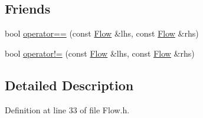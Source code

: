 \subsection*{Friends}
\begin{DoxyCompactItemize}
\item 
bool \hyperlink{class_vsid_common_1_1_flow_adf202422cece5e6dc6ad096f58c35b7c}{operator==} (const \hyperlink{class_vsid_common_1_1_flow}{Flow} \&lhs, const \hyperlink{class_vsid_common_1_1_flow}{Flow} \&rhs)
\item 
bool \hyperlink{class_vsid_common_1_1_flow_a8b8c36c44b03b0508540ba0c1db05e29}{operator!=} (const \hyperlink{class_vsid_common_1_1_flow}{Flow} \&lhs, const \hyperlink{class_vsid_common_1_1_flow}{Flow} \&rhs)
\end{DoxyCompactItemize}


\subsection{Detailed Description}


Definition at line 33 of file Flow.\-h.




